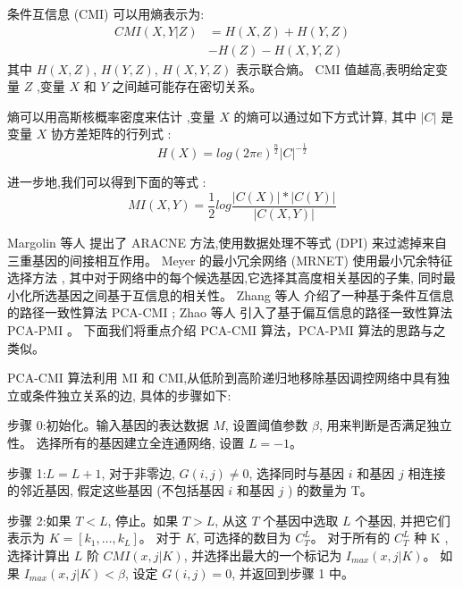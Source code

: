 条件互信息 (CMI) 可以用熵表示为:
\begin{equation}
\begin{split}
CMI(X,Y|Z) &= H(X,Z) + H(Y,Z)\\
               & - H(Z) - H(X,Y,Z)
\end{split}
\end{equation}
其中 $H(X,Z)$, $H(Y,Z)$, $H(X,Y,Z)$ 表示联合熵。
CMI 值越高,表明给定变量 $Z$ ,变量 $X$ 和 $Y$ 之间越可能存在密切关系。

熵可以用高斯核概率密度来估计 \cite{basso2005reverse},变量 $X$ 的熵可以通过如下方式计算, 
其中 $|C|$ 是变量 $X$ 协方差矩阵的行列式 \cite{zhang2011inferring}:
\begin{equation}
    H(X) = log(2\pi e )^\frac{n}{2} |C| ^ {-\frac{1}{2}}
\end{equation}

进一步地,我们可以得到下面的等式 \cite{zhang2011inferring}:
\begin{equation}
    MI(X,Y)=\frac{1}{2}log\frac{|C(X)|*|C(Y)|}{|C(X,Y)|}
\end{equation}

Margolin 等人 \cite{margolin2006aracne}提出了 ARACNE 方法,使用数据处理不等式 (DPI) 来过滤掉来自三重基因的间接相互作用。
Meyer \cite{meyer2007information} 的最小冗余网络 (MRNET) 使用最小冗余特征选择方法 \cite{peng2005feature},
其中对于网络中的每个候选基因,它选择其高度相关基因的子集, 同时最小化所选基因之间基于互信息的相关性。
Zhang 等人 \cite{zhang2011inferring} 介绍了一种基于条件互信息的路径一致性算法 PCA-CMI ; 
Zhao 等人 \cite{zhao2016part} 引入了基于偏互信息的路径一致性算法 PCA-PMI 。
下面我们将重点介绍 PCA-CMI 算法，PCA-PMI 算法的思路与之类似。

PCA-CMI 算法利用 MI 和 CMI,从低阶到高阶递归地移除基因调控网络中具有独立或条件独立关系的边, 具体的步骤如下:

步骤 0:初始化。输入基因的表达数据 $M$, 设置阈值参数 $\beta$, 用来判断是否满足独立性。
选择所有的基因建立全连通网络, 设置 $L=-1$。

步骤 1:$L=L+1$, 对于非零边, $G(i,j) \neq 0$, 选择同时与基因 $i$ 和基因 $j$ 相连接的邻近基因, 
假定这些基因 (不包括基因 $i$ 和基因 $j$ ) 的数量为 T。

步骤 2:如果 $T<L$, 停止。如果 $T>L$, 从这 $T$ 个基因中选取 $L$ 个基因, 
并把它们表示为 $K=[k_1,\ldots,k_L]$。
对于 $K$, 可选择的数目为 $C_T^L$。
对于所有的 $C_T^L$ 种 K ,选择计算出 $L$ 阶 $CMI(x,j|K)$,
并选择出最大的一个标记为 $I_{max}(x,j|K)$。
如果 $I_{max}(x,j|K) < \beta$, 设定 $G(i,j)=0$, 并返回到步骤 1 中。

